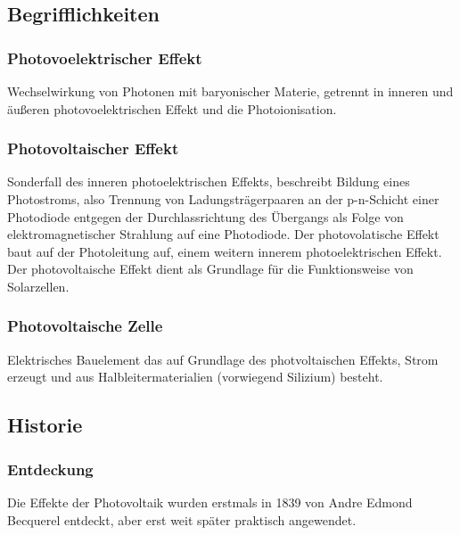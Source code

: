 \subsection{Begrifflichkeiten}
    \subsubsection{Photovoelektrischer Effekt}
        Wechselwirkung von Photonen mit baryonischer Materie, getrennt in
        inneren und äußeren photovoelektrischen Effekt und die Photoionisation.
        \cite{Wiki_PhotoelectricEffect}

    \subsubsection{Photovoltaischer Effekt}
        Sonderfall des inneren photoelektrischen Effekts, beschreibt Bildung eines
        Photostroms, also Trennung von Ladungsträgerpaaren an der p-n-Schicht
        einer Photodiode entgegen der Durchlassrichtung des Übergangs als Folge
        von elektromagnetischer Strahlung auf eine Photodiode.
        Der photovolatische Effekt baut auf der Photoleitung auf, einem weitern
        innerem photoelektrischen Effekt. \cite{Wiki_PhotoelectricEffect}
        Der photovoltaische Effekt dient als Grundlage für die Funktionsweise
        von Solarzellen.

    \subsubsection{Photovoltaische Zelle}
        Elektrisches Bauelement das auf Grundlage des photvoltaischen Effekts,
        Strom erzeugt und aus Halbleitermaterialien (vorwiegend Silizium) besteht.

\subsection{Historie}
    \subsubsection{Entdeckung}
        Die Effekte der Photovoltaik wurden erstmals in 1839 von Andre Edmond
        Becquerel entdeckt, aber erst weit später praktisch angewendet.
        \cite{Wiki_PhotovoltaicHistory}

